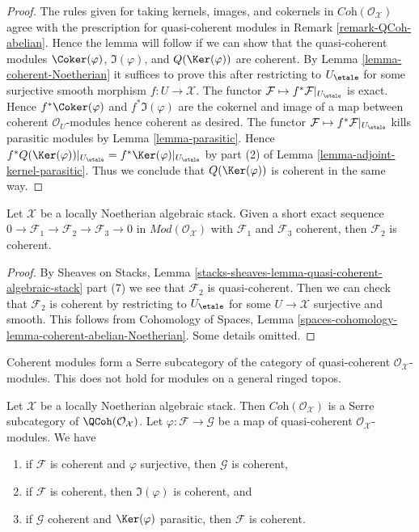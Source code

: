 \begin{proof}
The rules given for taking kernels, images, and cokernels in
$\textit{Coh}(\mathcal{O}_\mathcal{X})$ agree with the prescription
for quasi-coherent modules in Remark \ref{remark-QCoh-abelian}.
Hence the lemma will follow if we can show that the quasi-coherent modules
$\Coker(\varphi)$, $\Im(\varphi)$, and $Q(\Ker(\varphi))$ are coherent.
By Lemma \ref{lemma-coherent-Noetherian} it suffices to prove this after
restricting to $U_\etale$ for some surjective smooth morphism
$f : U \to \mathcal{X}$. The functor
$\mathcal{F} \mapsto f^*\mathcal{F}|_{U_\etale}$
is exact. Hence $f^*\Coker(\varphi)$ and $f^*\Im(\varphi)$ are
the cokernel and image of a map between coherent $\mathcal{O}_U$-modules
hence coherent as desired. The functor
$\mathcal{F} \mapsto f^*\mathcal{F}|_{U_\etale}$
kills parasitic modules by Lemma \ref{lemma-parasitic}.
Hence $f^*Q(\Ker(\varphi))|_{U_\etale} = f^*\Ker(\varphi)|_{U_\etale}$
by part (2) of Lemma \ref{lemma-adjoint-kernel-parasitic}.
Thus we conclude that $Q(\Ker(\varphi))$ is coherent in the same way.
\end{proof}

\begin{lemma}
\label{lemma-extension-coherent}
Let $\mathcal{X}$ be a locally Noetherian algebraic stack.
Given a short exact sequence
$0 \to \mathcal{F}_1 \to \mathcal{F}_2 \to \mathcal{F}_3 \to 0$
in $\textit{Mod}(\mathcal{O}_\mathcal{X})$
with $\mathcal{F}_1$ and $\mathcal{F}_3$ coherent, then
$\mathcal{F}_2$ is coherent.
\end{lemma}

\begin{proof}
By Sheaves on Stacks, Lemma
\ref{stacks-sheaves-lemma-quasi-coherent-algebraic-stack} part (7) we see that
$\mathcal{F}_2$ is quasi-coherent. Then we can check that
$\mathcal{F}_2$ is coherent by restricting to $U_\etale$
for some $U \to \mathcal{X}$ surjective and smooth.
This follows from Cohomology of Spaces, Lemma
\ref{spaces-cohomology-lemma-coherent-abelian-Noetherian}.
Some details omitted.
\end{proof}

\noindent
Coherent modules form a Serre subcategory of the
category of quasi-coherent $\mathcal{O}_\mathcal{X}$-modules.
This does not hold for modules on a general ringed topos.

\begin{lemma}
\label{lemma-coherent-Noetherian-quasi-coherent-sub-quotient}
Let $\mathcal{X}$ be a locally Noetherian algebraic stack.
Then $\textit{Coh}(\mathcal{O}_\mathcal{X})$ is a Serre subcategory of
$\QCoh(\mathcal{O}_\mathcal{X})$. Let $\varphi : \mathcal{F} \to \mathcal{G}$
be a map of quasi-coherent $\mathcal{O}_\mathcal{X}$-modules. We have
\begin{enumerate}
\item if $\mathcal{F}$ is coherent and $\varphi$ surjective,
then $\mathcal{G}$ is coherent,
\item if $\mathcal{F}$ is coherent, then $\Im(\varphi)$ is coherent, and
\item if $\mathcal{G}$ coherent and $\Ker(\varphi)$ parasitic, then
$\mathcal{F}$ is coherent.
\end{enumerate}
\end{lemma}

